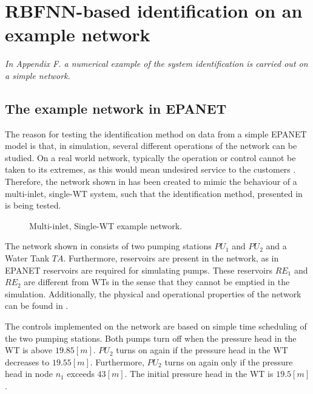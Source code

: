 \chapter{RBFNN-based identification on an example network}
\label{NN_based_example}

\emph{In Appendix F. a numerical example of the system identification is carried out on a simple network.}

\section{The example network in EPANET}
\label{example1_EPANET}

The reason for testing the identification method on data from a simple EPANET model is that, in simulation, several different operations of the network can be studied. On a real world network, typically the operation or control cannot be taken to its extremes, as this would mean undesired service to the customers . Therefore, the network shown in  has been created to mimic the behaviour of a multi-inlet, single-WT system, such that the identification method, presented in  is being tested. 

\begin{figure}[H]
\centering
 
\caption{Multi-inlet, Single-WT example network.}
\label{fig:epanet_example1_id}
\end{figure}
\vspace{-3mm}

The network shown in  consists of two pumping stations $PU_1$ and $PU_2$ and a Water Tank $TA$. Furthermore, reservoirs are present in the network, as in EPANET reservoirs are required for simulating pumps. These reservoirs $RE_1$ and $RE_2$ are different from WTs in the sense that they cannot be emptied in the simulation. Additionally, the physical and operational properties of the network can be found in . 

The controls implemented on the network are based on simple time scheduling of the two pumping stations. Both pumps turn off when the pressure head in the WT is above $19.85 [m]$. $PU_2$ turns on again if the pressure head in the WT decreases to $19.55 [m]$. Furthermore, $PU_2$ turns on again only if the pressure head in node $n_1$ exceeds $43 [m]$. The initial pressure head in the WT is $19.5 [m]$.

